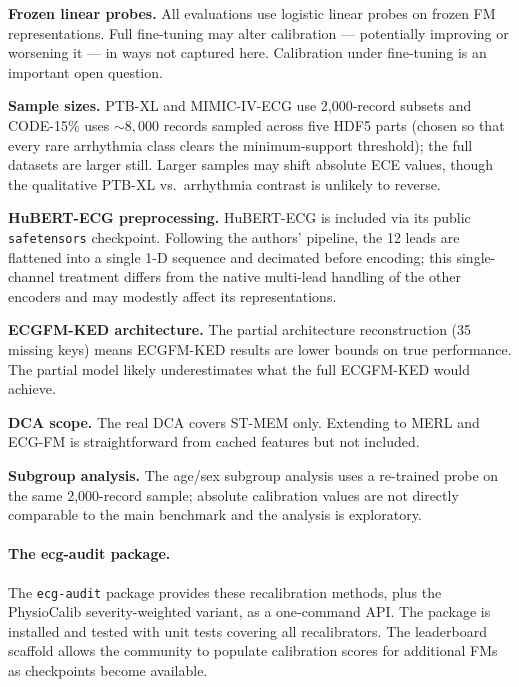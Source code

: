 \textbf{Frozen linear probes.} All evaluations use logistic linear probes on frozen
FM representations. Full fine-tuning may alter calibration --- potentially improving
or worsening it --- in ways not captured here. Calibration under fine-tuning is an
important open question.

\textbf{Sample sizes.} PTB-XL and MIMIC-IV-ECG use 2{,}000-record subsets and CODE-15\%
uses ${\sim}8{,}000$ records sampled across five HDF5 parts (chosen so that every rare
arrhythmia class clears the minimum-support threshold); the full datasets are larger still.
Larger samples may shift absolute ECE values, though the qualitative PTB-XL vs.\ arrhythmia
contrast is unlikely to reverse.

\textbf{HuBERT-ECG preprocessing.} HuBERT-ECG is included via its public \texttt{safetensors}
checkpoint. Following the authors' pipeline, the 12 leads are flattened into a single 1-D
sequence and decimated before encoding; this single-channel treatment differs from the
native multi-lead handling of the other encoders and may modestly affect its representations.

\textbf{ECGFM-KED architecture.} The partial architecture reconstruction (35 missing keys)
means ECGFM-KED results are lower bounds on true performance. The partial model likely
underestimates what the full ECGFM-KED would achieve.

\textbf{DCA scope.} The real DCA covers ST-MEM only.
Extending to MERL and ECG-FM is straightforward from cached features but not included.

\textbf{Subgroup analysis.} The age/sex subgroup analysis uses a re-trained probe
on the same 2,000-record sample; absolute calibration values are not directly
comparable to the main benchmark and the analysis is exploratory.

\paragraph{The ecg-audit package.}
The \texttt{ecg-audit} package provides these recalibration methods, plus the PhysioCalib
severity-weighted variant, as a one-command API. The package is installed and tested with
unit tests covering all recalibrators. The leaderboard scaffold allows the community to
populate calibration scores for additional FMs as checkpoints become available.
